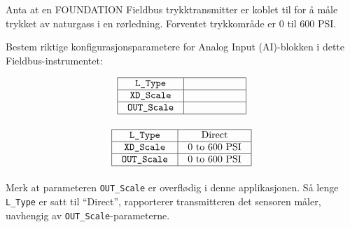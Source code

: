 

Anta at en FOUNDATION Fieldbus trykktransmitter er koblet til for å måle trykket av naturgass i en rørledning. Forventet trykkområde er 0 til 600 PSI.

\vskip 10pt

Bestem riktige konfigurasjonsparametere for Analog Input (AI)-blokken i dette Fieldbus-instrumentet:


$$\vbox{\offinterlineskip
\halign{\strut
\vrule \quad\hfil # \ \hfil & 
\vrule \quad\hfil # \ \hfil \vrule \cr
\noalign{\hrule}
%
{\tt L\_Type} & \hskip 50pt \cr
%
\noalign{\hrule}
%
{\tt XD\_Scale} & \hskip 50pt \cr
%
\noalign{\hrule}
%
{\tt OUT\_Scale} & \hskip 50pt \cr
%
\noalign{\hrule}
} %
}$$ %








$$\vbox{\offinterlineskip
\halign{\strut
\vrule \quad\hfil # \ \hfil & 
\vrule \quad\hfil # \ \hfil \vrule \cr
\noalign{\hrule}
%
{\tt L\_Type} & Direct \cr
%
\noalign{\hrule}
%
{\tt XD\_Scale} & 0 to 600 PSI \cr
%
\noalign{\hrule}
%
{\tt OUT\_Scale} & 0 to 600 PSI \cr
%
\noalign{\hrule}
} %
}$$ %

\vskip 10pt

Merk at parameteren {\tt OUT\_Scale} er overflødig i denne applikasjonen. Så lenge {\tt L\_Type} er satt til ``Direct'', rapporterer transmitteren det sensoren måler, uavhengig av {\tt OUT\_Scale}-parameterne.











